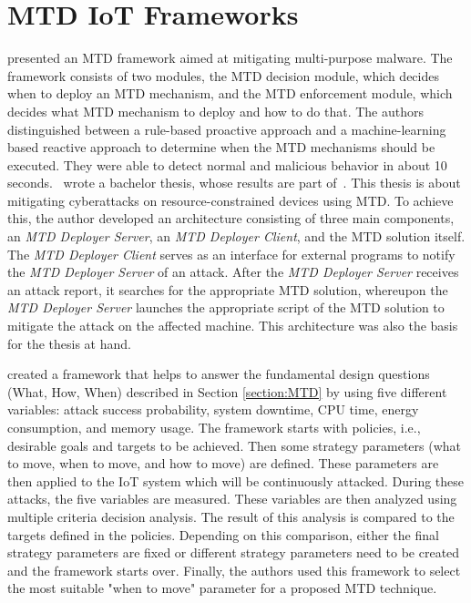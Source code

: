 \section{MTD IoT Frameworks}
\label{section:MTDFramework}

\cite{article:vonderAssen} presented an MTD framework aimed at mitigating multi-purpose malware. The framework consists of two modules, the MTD decision module, which decides when to deploy an MTD mechanism, and the MTD enforcement module, which decides what MTD mechanism to deploy and how to do that. The authors distinguished between a rule-based proactive approach and a machine-learning based reactive approach to determine when the MTD mechanisms should be executed. They were able to detect normal and malicious behavior in about 10 seconds.~\cite{article:Cedeno} wrote a bachelor thesis, whose results are part of~\cite{article:vonderAssen}. This thesis is about mitigating cyberattacks on resource-constrained devices using MTD. To achieve this, the author developed an architecture consisting of three main components, an \textit{MTD Deployer Server}, an \textit{MTD Deployer Client}, and the MTD solution itself. The \textit{MTD Deployer Client} serves as an interface for external programs to notify the \textit{MTD Deployer Server} of an attack. After the \textit{MTD Deployer Server} receives an attack report, it searches for the appropriate MTD solution, whereupon the \textit{MTD Deployer Server} launches the appropriate script of the MTD solution to mitigate the attack on the affected machine. This architecture was also the basis for the thesis at hand.


\cite{article:mercado-velazquez} created a framework that helps to answer the fundamental design questions (What, How, When) described in Section \ref{section:MTD} by using five different variables: attack success probability, system downtime, CPU time, energy consumption, and memory usage. The framework starts with policies, i.e., desirable goals and targets to be achieved. Then some strategy parameters (what to move, when to move, and how to move) are defined. These parameters are then applied to the IoT system which will be continuously attacked. During these attacks, the five variables are measured. These variables are then analyzed using multiple criteria decision analysis. The result of this analysis is compared to the targets defined in the policies. Depending on this comparison, either the final strategy parameters are fixed or different strategy parameters need to be created and the framework starts over.
Finally, the authors used this framework to select the most suitable "when to move" parameter for a proposed MTD technique.


